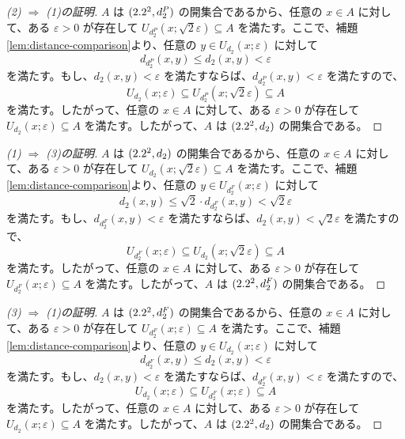 \documentclass[article,paper=a4paper]{jlreq}
\begin{document}
\begin{proof}[(2) $\Rightarrow$ (1)の証明]
    $A$ は $(2.2^2, d_2^P)$ の開集合であるから、任意の $x \in A$ に対して、ある $\varepsilon > 0$ が存在して $U_{d_2^P}(x;\sqrt{2}\varepsilon) \subseteq A$ を満たす。ここで、補題\ref{lem:distance-comparison}より、任意の $y \in U_{d_2}(x;\varepsilon)$ に対して
    \[d_{d_2^P}(x,y) \leq d_2(x,y) < \varepsilon\]
    を満たす。もし、$d_2(x,y) < \varepsilon$ を満たすならば、$d_{d_2^P}(x,y) < \varepsilon$ を満たすので、
    \[U_{d_2}(x;\varepsilon) \subseteq U_{d_2^P}(x;\sqrt{2}\varepsilon) \subseteq A\]
    を満たす。したがって、任意の $x \in A$ に対して、ある $\varepsilon > 0$ が存在して $U_{d_2}(x;\varepsilon) \subseteq A$ を満たす。したがって、$A$ は $(2.2^2, d_2)$ の開集合である。
\end{proof}

\begin{proof}[(1) $\Rightarrow$ (3)の証明]
    $A$ は $(2.2^2, d_2)$ の開集合であるから、任意の $x \in A$ に対して、ある $\varepsilon > 0$ が存在して $U_{d_2}(x;\sqrt{2}\varepsilon) \subseteq A$ を満たす。ここで、補題\ref{lem:distance-comparison}より、任意の $y \in U_{d_2^F}(x;\varepsilon)$ に対して
    \[d_2(x,y) \leq \sqrt{2}\cdot d_{d_2^F}(x,y) < \sqrt{2}\varepsilon\]
    を満たす。もし、$d_{d_2^F}(x,y) < \varepsilon$ を満たすならば、$d_2(x,y) < \sqrt{2}\varepsilon$ を満たすので、
    \[U_{d_2^F}(x;\varepsilon) \subseteq U_{d_2}(x;\sqrt{2}\varepsilon) \subseteq A\]
    を満たす。したがって、任意の $x \in A$ に対して、ある $\varepsilon > 0$ が存在して $U_{d_2^F}(x;\varepsilon) \subseteq A$ を満たす。したがって、$A$ は $(2.2^2, d_{2}^{F})$ の開集合である。
\end{proof}

\begin{proof}[(3) $\Rightarrow$ (1)の証明]
    $A$ は $(2.2^2, d_{2}^{F})$ の開集合であるから、任意の $x \in A$ に対して、ある $\varepsilon > 0$ が存在して $U_{d_2^F}(x;\varepsilon) \subseteq A$ を満たす。ここで、補題\ref{lem:distance-comparison}より、任意の $y \in U_{d_2}(x;\varepsilon)$ に対して
    \[d_{d_2^F}(x,y) \leq d_2(x,y) < \varepsilon\]
    を満たす。もし、$d_2(x,y) < \varepsilon$ を満たすならば、$d_{d_2^F}(x,y) < \varepsilon$ を満たすので、
    \[U_{d_2}(x;\varepsilon) \subseteq U_{d_2^F}(x;\varepsilon) \subseteq A\]
    を満たす。したがって、任意の $x \in A$ に対して、ある $\varepsilon > 0$ が存在して $U_{d_2}(x;\varepsilon) \subseteq A$ を満たす。したがって、$A$ は $(2.2^2, d_2)$ の開集合である。
\end{proof}
\end{document}
